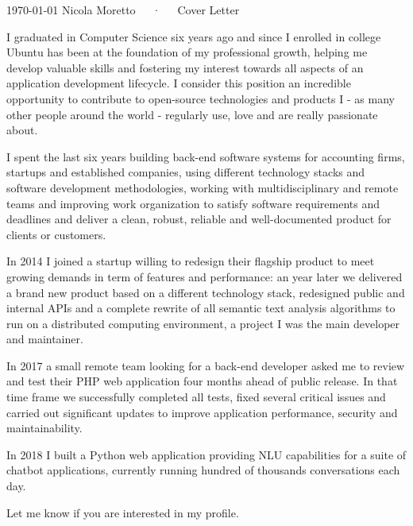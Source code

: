 \documentclass[11pt, a4paper]{awesome-cv}
\begin{document}
\makecvheader[R]

\makecvfooter
  {\today}
  {Nicola Moretto~~~·~~~Cover Letter}
  {}

\makelettertitle

\begin{cvletter}


I graduated in Computer Science six years ago and since I enrolled in college Ubuntu has been at the foundation of my professional growth, helping me develop valuable skills and fostering my interest towards all aspects of an application development lifecycle. I consider this position an incredible opportunity to contribute to open-source technologies and products I - as many other people around the world - regularly use, love and are really passionate about.

I spent the last six years building back-end software systems for accounting firms, startups and established companies, using different technology stacks and software development methodologies, working with multidisciplinary and remote teams and improving work organization to satisfy software requirements and deadlines and deliver a clean, robust, reliable and well-documented product for clients or customers.

In 2014 I joined a startup willing to redesign their flagship product to meet growing demands in term of features and performance: an year later we delivered a brand new product based on a different technology stack, redesigned public and internal APIs and a complete rewrite of all semantic text analysis algorithms to run on a distributed computing environment, a project I was the main developer and maintainer.

In 2017 a small remote team looking for a back-end developer asked me to review and test their PHP web application four months ahead of public release. In that time frame we successfully completed all tests, fixed several critical issues and carried out significant updates to improve application performance, security and maintainability.

In 2018 I built a Python web application providing NLU capabilities for a suite of chatbot applications, currently running hundred of thousands conversations each day.

Let me know if you are interested in my profile.

\end{cvletter}


\makeletterclosing
\end{document}
